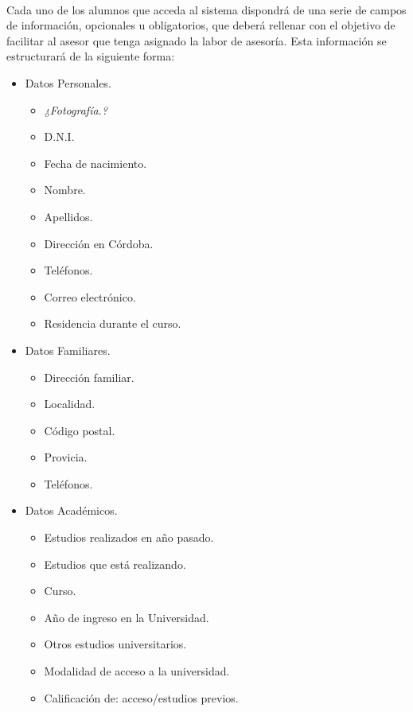       \paragraph{}Cada uno de los alumnos que acceda al sistema dispondrá
      de una serie de campos de información, opcionales u obligatorios, que
      deberá rellenar con el objetivo de facilitar al asesor que tenga asignado
      la labor de asesoría. Esta información se estructurará de la siguiente
      forma:

      \begin{itemize}
         \item Datos Personales.
         \begin{itemize}
            \item \textit{¿Fotografía.?}
            \item D.N.I.
            \item Fecha de nacimiento.
            \item Nombre.
            \item Apellidos.
            \item Dirección en Córdoba.
            \item Teléfonos.
            \item Correo electrónico.
            \item Residencia durante el curso.
         \end{itemize}
         \item Datos Familiares.
         \begin{itemize}
            \item Dirección familiar.
            \item Localidad.
            \item Código postal.
            \item Provicia.
            \item Teléfonos.
         \end{itemize}
         \item Datos Académicos.
         \begin{itemize}
            \item Estudios realizados en año pasado.
            \item Estudios que está realizando.
            \item Curso.
            \item Año de ingreso en la Universidad.
            \item Otros estudios universitarios.
            \item Modalidad de acceso a la universidad.
            \item Calificación de: acceso/estudios previos.
         \end{itemize}
      \end{itemize}

